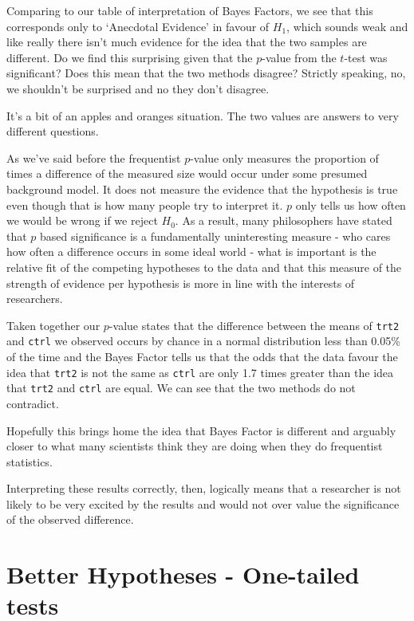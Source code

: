\documentclass[
]{book}
\begin{document}
Comparing to our table of interpretation of Bayes Factors, we see that this corresponds only to `Anecdotal Evidence' in favour of \(H_1\), which sounds weak and like really there isn't much evidence for the idea that the two samples are different. Do we find this surprising given that the \(p\)-value from the \(t\)-test was significant? Does this mean that the two methods disagree? Strictly speaking, no, we shouldn't be surprised and no they don't disagree.

It's a bit of an apples and oranges situation. The two values are answers to very different questions.

As we've said before the frequentist \(p\)-value only measures the proportion of times a difference of the measured size would occur under some presumed background model. It does not measure the evidence that the hypothesis is true even though that is how many people try to interpret it. \(p\) only tells us how often we would be wrong if we reject \(H_0\). As a result, many philosophers have stated that \(p\) based significance is a fundamentally uninteresting measure - who cares how often a difference occurs in some ideal world - what is important is the relative fit of the competing hypotheses to the data and that this measure of the strength of evidence per hypothesis is more in line with the interests of researchers.

Taken together our \(p\)-value states that the difference between the means of \texttt{trt2} and \texttt{ctrl} we observed occurs by chance in a normal distribution less than 0.05\% of the time and the Bayes Factor tells us that the odds that the data favour the idea that \texttt{trt2} is not the same as \texttt{ctrl} are only 1.7 times greater than the idea that \texttt{trt2} and \texttt{ctrl} are equal. We can see that the two methods do not contradict.

Hopefully this brings home the idea that Bayes Factor is different and arguably closer to what many scientists think they are doing when they do frequentist statistics.

Interpreting these results correctly, then, logically means that a researcher is not likely to be very excited by the results and would not over value the significance of the observed difference.

\hypertarget{better-hypotheses---one-tailed-tests}{%
\section{Better Hypotheses - One-tailed tests}\label{better-hypotheses---one-tailed-tests}}
\end{document}

